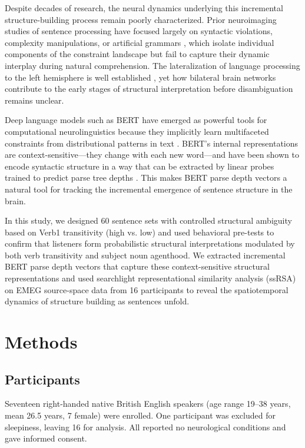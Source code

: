 \documentclass[12pt]{article}
\begin{document}
Despite decades of research, the neural dynamics underlying this incremental structure-building process remain poorly characterized. Prior neuroimaging studies of sentence processing have focused largely on syntactic violations, complexity manipulations, or artificial grammars \citep{friederici2011brain, hagoort2005broca}, which isolate individual components of the constraint landscape but fail to capture their dynamic interplay during natural comprehension. The lateralization of language processing to the left hemisphere is well established \citep{hickok2007cortical}, yet how bilateral brain networks contribute to the early stages of structural interpretation before disambiguation remains unclear.

Deep language models such as BERT \citep{devlin2019bert} have emerged as powerful tools for computational neurolinguistics because they implicitly learn multifaceted constraints from distributional patterns in text \citep{hewitt2019structural}. BERT's internal representations are context-sensitive---they change with each new word---and have been shown to encode syntactic structure in a way that can be extracted by linear probes trained to predict parse tree depths \citep{demarneffe2006generating}. This makes BERT parse depth vectors a natural tool for tracking the incremental emergence of sentence structure in the brain.

In this study, we designed 60 sentence sets with controlled structural ambiguity based on Verb1 transitivity (high vs. low) and used behavioral pre-tests to confirm that listeners form probabilistic structural interpretations modulated by both verb transitivity and subject noun agenthood. We extracted incremental BERT parse depth vectors that capture these context-sensitive structural representations and used searchlight representational similarity analysis (ssRSA) on EMEG source-space data from 16 participants to reveal the spatiotemporal dynamics of structure building as sentences unfold.

\section{Methods}

\subsection{Participants}

Seventeen right-handed native British English speakers (age range 19--38 years, mean 26.5 years, 7 female) were enrolled. One participant was excluded for sleepiness, leaving 16 for analysis. All reported no neurological conditions and gave informed consent.
\end{document}
